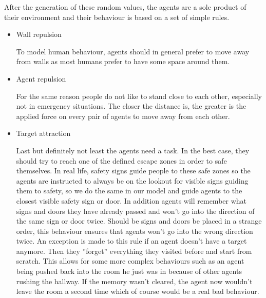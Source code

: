 \documentclass[11pt]{article}
\begin{document}
After the generation of these random values, the agents are a sole product of their environment and their behaviour is based on a set of simple rules.

\begin{itemize}
    \item Wall repulsion
    
    To model human behaviour, agents should in general prefer to move away from walls as most humans prefer to have some space around them.

    \item Agent repulsion
    
    For the same reason people do not like to stand close to each other, especially not in emergency situations. The closer the distance is, the greater is the applied force on every pair of agents to move away from each other.

%    

    \item Target attraction
    
    Last but definitely not least the agents need a task. In the best case, they should try to reach one of the defined escape zones in order to safe themselves. In real life, safety signs guide people to these safe zones so the agents are instructed to always be on the lookout for visible signs guiding them to safety, so we do the same in our model and guide agents to the closest visible safety sign or door. In addition agents will remember what signs and doors they have already passed and won't go into the direction of the same sign or door twice. Should be signs and doors be placed in a strange order, this behaviour ensures that agents won't go into the wrong direction twice. An exception is made to this rule if an agent doesn't have a target anymore. Then they ''forget'' everything they visited before and start from scratch. This allows for some more complex behaviours such as an agent being pushed back into the room he just was in because of other agents rushing the hallway. If the memory wasn't cleared, the agent now wouldn't leave the room a second time which of course would be a real bad behaviour.
\end{itemize}
\end{document}
